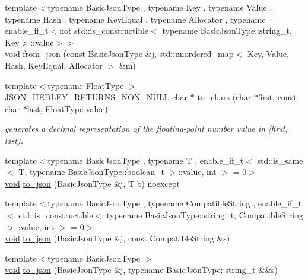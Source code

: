 \begin{DoxyCompactItemize}
\item 
{\footnotesize template$<$typename Basic\+Json\+Type , typename Key , typename Value , typename Hash , typename Key\+Equal , typename Allocator , typename  = enable\+\_\+if\+\_\+t$<$not std\+::is\+\_\+constructible$<$                                     typename Basic\+Json\+Type\+::string\+\_\+t, Key$>$\+::value$>$$>$ }\\\hyperlink{namespacenlohmann_1_1detail_a59fca69799f6b9e366710cb9043aa77d}{void} \hyperlink{namespacenlohmann_1_1detail_aef5c8ea108f4d2b03fb4a635617510de}{from\+\_\+json} (const Basic\+Json\+Type \&j, std\+::unordered\+\_\+map$<$ Key, Value, Hash, Key\+Equal, Allocator $>$ \&m)
\item 
{\footnotesize template$<$typename Float\+Type $>$ }\\J\+S\+O\+N\+\_\+\+H\+E\+D\+L\+E\+Y\+\_\+\+R\+E\+T\+U\+R\+N\+S\+\_\+\+N\+O\+N\+\_\+\+N\+U\+LL char $\ast$ \hyperlink{namespacenlohmann_1_1detail_a6cca370ac6c99294dbe4fe24716a57dd}{to\+\_\+chars} (char $\ast$first, const char $\ast$last, Float\+Type value)
\begin{DoxyCompactList}\small\item\em generates a decimal representation of the floating-\/point number value in \mbox{[}first, last). \end{DoxyCompactList}\item 
{\footnotesize template$<$typename Basic\+Json\+Type , typename T , enable\+\_\+if\+\_\+t$<$ std\+::is\+\_\+same$<$ T, typename Basic\+Json\+Type\+::boolean\+\_\+t $>$\+::value, int $>$  = 0$>$ }\\\hyperlink{namespacenlohmann_1_1detail_a59fca69799f6b9e366710cb9043aa77d}{void} \hyperlink{namespacenlohmann_1_1detail_a1a804b98cbe89b7e44b698f2ca860490}{to\+\_\+json} (Basic\+Json\+Type \&j, T b) noexcept
\item 
{\footnotesize template$<$typename Basic\+Json\+Type , typename Compatible\+String , enable\+\_\+if\+\_\+t$<$ std\+::is\+\_\+constructible$<$ typename Basic\+Json\+Type\+::string\+\_\+t, Compatible\+String $>$\+::value, int $>$  = 0$>$ }\\\hyperlink{namespacenlohmann_1_1detail_a59fca69799f6b9e366710cb9043aa77d}{void} \hyperlink{namespacenlohmann_1_1detail_a7356ed05cdbbb080cee80e1211e1c6c9}{to\+\_\+json} (Basic\+Json\+Type \&j, const Compatible\+String \&s)
\item 
{\footnotesize template$<$typename Basic\+Json\+Type $>$ }\\\hyperlink{namespacenlohmann_1_1detail_a59fca69799f6b9e366710cb9043aa77d}{void} \hyperlink{namespacenlohmann_1_1detail_a4aa1ca6b7c61bf19d1f30ea5b669f68e}{to\+\_\+json} (Basic\+Json\+Type \&j, typename Basic\+Json\+Type\+::string\+\_\+t \&\&s)

\end{DoxyCompactItemize}
